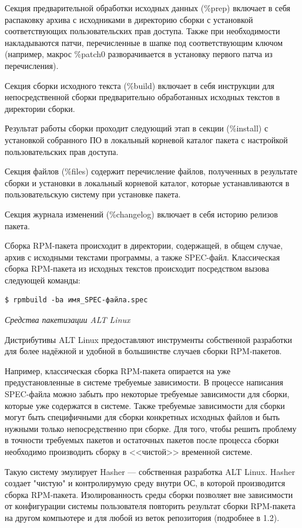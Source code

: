 \documentclass[bachelor, och, pract]{SCWorks}
\begin{document}
Секция предварительной обработки исходных данных (\%prep) включает в себя распаковку архива с исходниками в директорию сборки с установкой соответствующих пользовательских прав доступа.
Также при необходимости накладываются патчи, перечисленные в шапке под соответствующим ключом (например, макрос \%patch0 разворачивается в установку первого патча из перечисления).

Секция сборки исходного текста (\%build) включает в себя инструкции для непосредственной сборки предварительно обработанных исходных текстов в директории сборки.

Результат работы сборки проходит следующий этап в секции (\%install) с установкой собранного ПО в локальный корневой каталог пакета с настройкой пользовательских прав доступа.

Секция файлов (\%files) содержит перечисление файлов, полученных в результате сборки и установки в локальный корневой каталог, которые устанавливаются в пользовательскую систему при установке пакета.

Секция журнала изменений (\%changelog) включает в себя историю релизов пакета\cite{a_rpm-macro}.

Сборка RPM-пакета происходит в директории, содержащей, в общем случае, архив с исходными текстами программы, а также SPEC-файл.
Классическая сборка RPM-пакета из исходных текстов происходит посредством вызова следующей команды:

\begin{Verbatim}
$ rpmbuild -ba имя_SPEC-файла.spec
\end{Verbatim}

\textit{Средства пакетизации ALT Linux}

Дистрибутивы ALT Linux предоставляют инструменты собственной разработки для более надёжной и удобной в большинстве случаев сборки RPM-пакетов.

Например, классическая сборка RPM-пакета опирается на уже предустановленные в системе требуемые зависимости.
В процессе написания SPEC-файла можно забыть про некоторые требуемые зависимости для сборки, которые уже содержатся в системе.
Также требуемые зависимости для сборки могут быть специфичными для сборки конкретных исходных файлов и быть нужными только непосредственно при сборке.
Для того, чтобы решить проблему в точности требуемых пакетов и остаточных пакетов после процесса сборки необходимо производить сборку в <<чистой>> временной системе.

Такую систему эмулирует Hasher --- собственная разработка ALT Linux.
Hasher создает "чистую" и контролирумую среду внутри ОС, в которой производится сборка RPM-пакета.
Изолированность среды сборки позволяет вне зависимости от конфигурации системы пользователя повторить результат сборки RPM-пакета на другом компьютере и для любой из веток репозитория (подробнее в 1.2).
\end{document}
